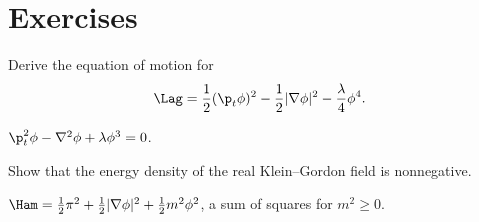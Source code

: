 \section*{Exercises}

\begin{exercise}
Derive the equation of motion for
\[
  \Lag=\frac12(\p_t\phi)^2-\frac12|\nabla\phi|^2-\frac{\lambda}{4}\phi^4.
\]
\begin{answer}
\(\p_t^2\phi-\nabla^2\phi+\lambda\phi^3=0\).
\end{answer}
\end{exercise}

\begin{exercise}
Show that the energy density of the real Klein--Gordon field is nonnegative.
\begin{answer}
\(\Ham=\frac12\pi^2+\frac12|\nabla\phi|^2+\frac12m^2\phi^2\), a sum of squares for \(m^2\ge0\).
\end{answer}
\end{exercise}

